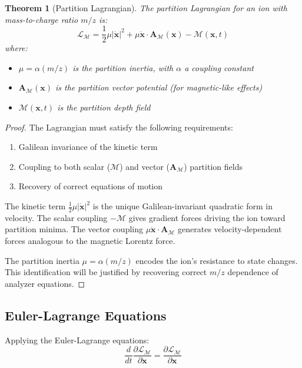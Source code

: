 \documentclass[twocolumn,10pt,a4paper]{article}
\newtheorem{theorem}{Theorem}[section]
\theoremstyle{definition}
\theoremstyle{remark}
\newcommand{\Mdepth}{\mathcal{M}}
\newcommand{\Lagr}{\mathcal{L}}
\newcommand{\Apartition}{\mathbf{A}_{\mathcal{M}}}
\newcommand{\partinert}{\mu}
\begin{document}
\begin{theorem}[Partition Lagrangian]
\label{thm:lagrangian}
The partition Lagrangian for an ion with mass-to-charge ratio $m/z$ is:
\begin{equation}
    \boxed{\Lagr_{\Mdepth} = \frac{1}{2}\partinert|\dot{\mathbf{x}}|^2 + \partinert\dot{\mathbf{x}}\cdot\Apartition(\mathbf{x}) - \Mdepth(\mathbf{x}, t)}
    \label{eq:partition_lagrangian}
\end{equation}
where:
\begin{itemize}
    \item $\partinert = \alpha(m/z)$ is the partition inertia, with $\alpha$ a coupling constant
    \item $\Apartition(\mathbf{x})$ is the partition vector potential (for magnetic-like effects)
    \item $\Mdepth(\mathbf{x}, t)$ is the partition depth field
\end{itemize}
\end{theorem}

\begin{proof}
The Lagrangian must satisfy the following requirements:
\begin{enumerate}
    \item Galilean invariance of the kinetic term
    \item Coupling to both scalar ($\Mdepth$) and vector ($\Apartition$) partition fields
    \item Recovery of correct equations of motion
\end{enumerate}

The kinetic term $\frac{1}{2}\partinert|\dot{\mathbf{x}}|^2$ is the unique Galilean-invariant quadratic form in velocity. The scalar coupling $-\Mdepth$ gives gradient forces driving the ion toward partition minima. The vector coupling $\partinert\dot{\mathbf{x}}\cdot\Apartition$ generates velocity-dependent forces analogous to the magnetic Lorentz force.

The partition inertia $\partinert = \alpha(m/z)$ encodes the ion's resistance to state changes. This identification will be justified by recovering correct $m/z$ dependence of analyzer equations.
\end{proof}

\subsection{Euler-Lagrange Equations}

Applying the Euler-Lagrange equations:
\begin{equation}
    \frac{d}{dt}\frac{\partial \Lagr_{\Mdepth}}{\partial \dot{\mathbf{x}}} = \frac{\partial \Lagr_{\Mdepth}}{\partial \mathbf{x}}
    \label{eq:euler_lagrange}
\end{equation}
\end{document}
